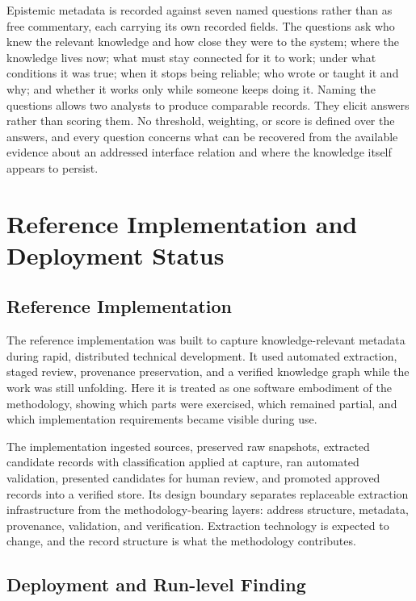 \documentclass[conference]{IEEEtran}
\begin{document}
Epistemic metadata is recorded against seven named questions rather than as free commentary, each carrying its own recorded fields. The questions ask who knew the relevant knowledge and how close they were to the system; where the knowledge lives now; what must stay connected for it to work; under what conditions it was true; when it stops being reliable; who wrote or taught it and why; and whether it works only while someone keeps doing it. Naming the questions allows two analysts to produce comparable records. They elicit answers rather than scoring them. No threshold, weighting, or score is defined over the answers, and every question concerns what can be recovered from the available evidence about an addressed interface relation and where the knowledge itself appears to persist.

\section{Reference Implementation and Deployment Status}\label{sec:7}

\subsection{Reference Implementation}\label{sec:7-1}

The reference implementation was built to capture knowledge-relevant metadata during rapid, distributed technical development. It used automated extraction, staged review, provenance preservation, and a verified knowledge graph while the work was still unfolding. Here it is treated as one software embodiment of the methodology, showing which parts were exercised, which remained partial, and which implementation requirements became visible during use.

The implementation ingested sources, preserved raw snapshots, extracted candidate records with classification applied at capture, ran automated validation, presented candidates for human review, and promoted approved records into a verified store. Its design boundary separates replaceable extraction infrastructure from the methodology-bearing layers: address structure, metadata, provenance, validation, and verification. Extraction technology is expected to change, and the record structure is what the methodology contributes.

\subsection{Deployment and Run-level Finding}\label{sec:7-2}
\end{document}
